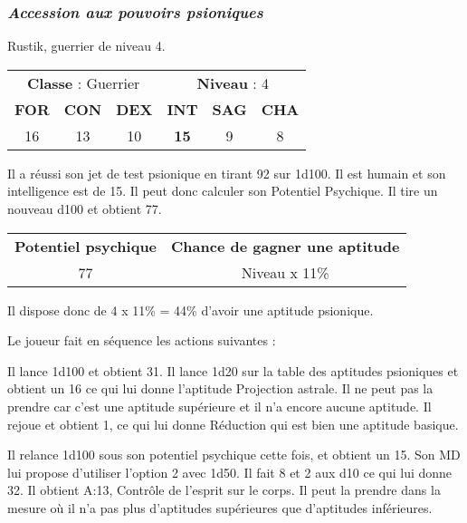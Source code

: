 \subsubsection*{\textit{Accession aux pouvoirs psioniques}}

Rustik, guerrier de niveau 4.
\bigskip

\begin{tabular}{cccccc}
\multicolumn{3}{c}{\textbf{Classe} : Guerrier} & \multicolumn{3}{c}{\textbf{Niveau} : 4} \\
\textbf{FOR} & \textbf{CON} & \textbf{DEX} & \textbf{INT} & \textbf{SAG} & \textbf{CHA} \\
16 & 13 & 10 & \textbf{15} & 9 & 8 \\
\end{tabular}

\bigskip

Il a réussi son jet de test psionique en tirant 92 sur 1d100. Il est humain et son intelligence est de 15. Il peut donc calculer son Potentiel Psychique. Il tire un nouveau d100 et obtient 77.

\bigskip

\begin{tabular}{cc}
\textbf{Potentiel psychique} & \textbf{Chance de gagner une aptitude}\\
77 & Niveau x 11\% \\
\end{tabular}

\bigskip

Il dispose donc de 4 x 11\% = 44\% d'avoir une aptitude psionique.

\bigskip

Le joueur fait en séquence les actions suivantes :

\bigskip

Il lance 1d100 et obtient 31. Il lance 1d20 sur la table des aptitudes psioniques et obtient un 16 ce qui lui donne l'aptitude Projection astrale. Il ne peut pas la prendre car c'est une aptitude supérieure et il n'a encore aucune aptitude. Il rejoue et obtient 1, ce qui lui donne Réduction qui est bien une aptitude basique.

\bigskip

Il relance 1d100 sous son potentiel psychique cette fois, et obtient un 15. Son MD lui propose d'utiliser l'option 2 avec 1d50. Il fait 8 et 2 aux d10 ce qui lui donne 32. Il obtient A:13, Contrôle de l'esprit sur le corps. Il peut la prendre dans la mesure où il n'a pas plus d'aptitudes supérieures que d'aptitudes inférieures.

